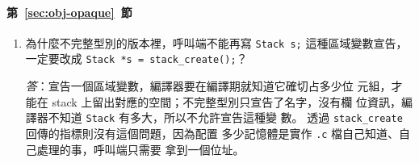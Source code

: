 \paragraph{第~\ref{sec:obj-opaque}~節}
\begin{enumerate}
\item 為什麼不完整型別的版本裡，呼叫端不能再寫
\texttt{Stack s;} 這種區域變數宣告，一定要改成
\texttt{Stack *s = stack\_create();}？

\textit{答}：宣告一個區域變數，編譯器要在編譯期就知道它確切占多少位
元組，才能在 stack 上留出對應的空間；不完整型別只宣告了名字，沒有欄
位資訊，編譯器不知道 \texttt{Stack} 有多大，所以不允許宣告這種變
數。 透過 \texttt{stack\_create} 回傳的指標則沒有這個問題，因為配置
多少記憶體是實作 \texttt{.c} 檔自己知道、自己處理的事，呼叫端只需要
拿到一個位址。
\end{enumerate}

